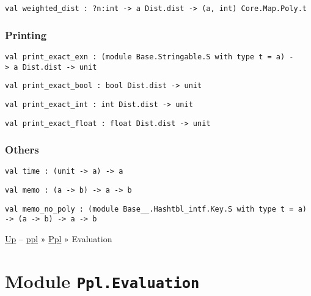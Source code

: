 \protect\hyperlink{val-weightedux5fdist}{}\texttt{val\ weighted\_dist\ :\ ?⁠n:int\ -\textgreater{}\ \textquotesingle{}a\ Dist.dist\ -\textgreater{}\ (\textquotesingle{}a,~int)\ Core.Map.Poly.t}

\hypertarget{print}{\subsubsection{\texorpdfstring{\protect\hyperlink{print}{}Printing}{Printing}}\label{print}}

\protect\hyperlink{val-printux5fexactux5fexn}{}\texttt{val\ print\_exact\_exn\ :\ (module\ Base.Stringable.S\ with\ type\ t\ =\ \textquotesingle{}a)\ -\textgreater{}\ \textquotesingle{}a\ Dist.dist\ -\textgreater{}\ unit}

\protect\hyperlink{val-printux5fexactux5fbool}{}\texttt{val\ print\_exact\_bool\ :\ bool\ Dist.dist\ -\textgreater{}\ unit}

\protect\hyperlink{val-printux5fexactux5fint}{}\texttt{val\ print\_exact\_int\ :\ int\ Dist.dist\ -\textgreater{}\ unit}

\protect\hyperlink{val-printux5fexactux5ffloat}{}\texttt{val\ print\_exact\_float\ :\ float\ Dist.dist\ -\textgreater{}\ unit}

\hypertarget{otherux5fhelpers}{\subsubsection{\texorpdfstring{\protect\hyperlink{otherux5fhelpers}{}Others}{Others}}\label{otherux5fhelpers}}

\protect\hyperlink{val-time}{}\texttt{val\ time\ :\ (unit\ -\textgreater{}\ \textquotesingle{}a)\ -\textgreater{}\ \textquotesingle{}a}

\protect\hyperlink{val-memo}{}\texttt{val\ memo\ :\ (\textquotesingle{}a\ -\textgreater{}\ \textquotesingle{}b)\ -\textgreater{}\ \textquotesingle{}a\ -\textgreater{}\ \textquotesingle{}b}

\protect\hyperlink{val-memoux5fnoux5fpoly}{}\texttt{val\ memo\_no\_poly\ :\ (module\ Base\_\_.Hashtbl\_intf.Key.S\ with\ type\ t\ =\ \textquotesingle{}a)\ -\textgreater{}\ (\textquotesingle{}a\ -\textgreater{}\ \textquotesingle{}b)\ -\textgreater{}\ \textquotesingle{}a\ -\textgreater{}\ \textquotesingle{}b}

\href{../index.html}{Up} -- \href{../../index.html}{ppl} »
\href{../index.html}{Ppl} » Evaluation

\section{\texorpdfstring{Module
\texttt{Ppl.Evaluation}}{Module Ppl.Evaluation}}\label{module-ppl.evaluation}

